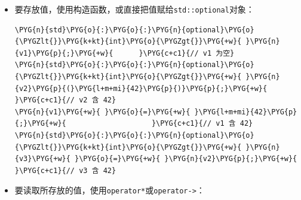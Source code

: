 \begin{itemize}
\item 要存放值，使用构造函数，或直接把值赋给\texttt{std::\allowbreak{}optional}对象：



\begin{codeblockbg}
\begin{Verbatim}[commandchars=\\\{\},breaklines=true,breakanywhere=true,fontsize=\codefont,xleftmargin=17bp]
\PYG{n}{std}\PYG{o}{:}\PYG{o}{:}\PYG{n}{optional}\PYG{o}{\PYGZlt{}}\PYG{k+kt}{int}\PYG{o}{\PYGZgt{}}\PYG{+w}{ }\PYG{n}{v1}\PYG{p}{;}\PYG{+w}{      }\PYG{c+c1}{// v1 为空}
\PYG{n}{std}\PYG{o}{:}\PYG{o}{:}\PYG{n}{optional}\PYG{o}{\PYGZlt{}}\PYG{k+kt}{int}\PYG{o}{\PYGZgt{}}\PYG{+w}{ }\PYG{n}{v2}\PYG{p}{(}\PYG{l+m+mi}{42}\PYG{p}{)}\PYG{p}{;}\PYG{+w}{  }\PYG{c+c1}{// v2 含 42}
\PYG{n}{v1}\PYG{+w}{ }\PYG{o}{=}\PYG{+w}{ }\PYG{l+m+mi}{42}\PYG{p}{;}\PYG{+w}{                    }\PYG{c+c1}{// v1 含 42}
\PYG{n}{std}\PYG{o}{:}\PYG{o}{:}\PYG{n}{optional}\PYG{o}{\PYGZlt{}}\PYG{k+kt}{int}\PYG{o}{\PYGZgt{}}\PYG{+w}{ }\PYG{n}{v3}\PYG{+w}{ }\PYG{o}{=}\PYG{+w}{ }\PYG{n}{v2}\PYG{p}{;}\PYG{+w}{ }\PYG{c+c1}{// v3 含 42}
\end{Verbatim}
\end{codeblockbg}



\item 要读取所存放的值，使用\texttt{operator*}或\texttt{operator->}：




\end{itemize}
